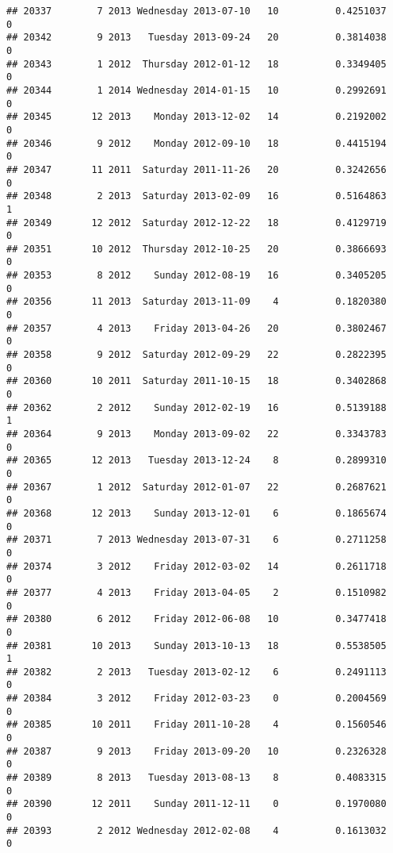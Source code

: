 \documentclass[
]{article}
\begin{document}
\begin{verbatim}
## 20337        7 2013 Wednesday 2013-07-10   10          0.4251037             0
## 20342        9 2013   Tuesday 2013-09-24   20          0.3814038             0
## 20343        1 2012  Thursday 2012-01-12   18          0.3349405             0
## 20344        1 2014 Wednesday 2014-01-15   10          0.2992691             0
## 20345       12 2013    Monday 2013-12-02   14          0.2192002             0
## 20346        9 2012    Monday 2012-09-10   18          0.4415194             0
## 20347       11 2011  Saturday 2011-11-26   20          0.3242656             0
## 20348        2 2013  Saturday 2013-02-09   16          0.5164863             1
## 20349       12 2012  Saturday 2012-12-22   18          0.4129719             0
## 20351       10 2012  Thursday 2012-10-25   20          0.3866693             0
## 20353        8 2012    Sunday 2012-08-19   16          0.3405205             0
## 20356       11 2013  Saturday 2013-11-09    4          0.1820380             0
## 20357        4 2013    Friday 2013-04-26   20          0.3802467             0
## 20358        9 2012  Saturday 2012-09-29   22          0.2822395             0
## 20360       10 2011  Saturday 2011-10-15   18          0.3402868             0
## 20362        2 2012    Sunday 2012-02-19   16          0.5139188             1
## 20364        9 2013    Monday 2013-09-02   22          0.3343783             0
## 20365       12 2013   Tuesday 2013-12-24    8          0.2899310             0
## 20367        1 2012  Saturday 2012-01-07   22          0.2687621             0
## 20368       12 2013    Sunday 2013-12-01    6          0.1865674             0
## 20371        7 2013 Wednesday 2013-07-31    6          0.2711258             0
## 20374        3 2012    Friday 2012-03-02   14          0.2611718             0
## 20377        4 2013    Friday 2013-04-05    2          0.1510982             0
## 20380        6 2012    Friday 2012-06-08   10          0.3477418             0
## 20381       10 2013    Sunday 2013-10-13   18          0.5538505             1
## 20382        2 2013   Tuesday 2013-02-12    6          0.2491113             0
## 20384        3 2012    Friday 2012-03-23    0          0.2004569             0
## 20385       10 2011    Friday 2011-10-28    4          0.1560546             0
## 20387        9 2013    Friday 2013-09-20   10          0.2326328             0
## 20389        8 2013   Tuesday 2013-08-13    8          0.4083315             0
## 20390       12 2011    Sunday 2011-12-11    0          0.1970080             0
## 20393        2 2012 Wednesday 2012-02-08    4          0.1613032             0

\end{verbatim}
\end{document}

